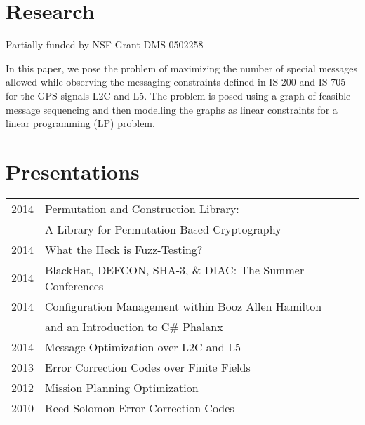 \documentclass[letterpaper]{deedy-resume} %
\begin{document}
\begin{minipage}[t]{0.66\textwidth}
\begin{tightitemize}
\end{tightitemize}



\sectionspace %


\section{Research}


Partially funded by NSF Grant DMS-0502258

\sectionspace %



In this paper, we pose the problem of maximizing the number of special messages allowed while observing the messaging constraints defined in IS-200 and IS-705 for the GPS signals L2C and L5.  The problem is posed using a graph of feasible message sequencing and then modelling the graphs as linear constraints for a linear programming (LP) problem.
\sectionspace %


\section{Presentations} 

\begin{tabular}{rll}
2014     & Permutation and Construction Library: \\
		 & A Library for Permutation Based Cryptography\\
2014	 & What the Heck is Fuzz-Testing?\\
2014	 & BlackHat, DEFCON, SHA-3, \& DIAC: The Summer Conferences\\
2014	 & Configuration Management within Booz Allen Hamilton \\
		 & and an Introduction to C\# Phalanx\\
2014  	 & Message Optimization over L2C and L5\\
2013 	 & Error Correction Codes over Finite Fields \\
2012 	 & Mission Planning Optimization \\
2010 	 & Reed Solomon Error Correction Codes\\
\end{tabular}


\end{minipage}
\end{document}
